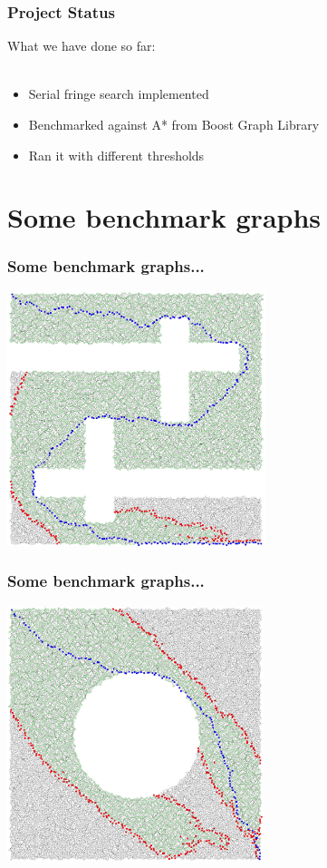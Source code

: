 \documentclass{beamer}
\begin{document}
\begin{frame}
\frametitle{Project Status}
What we have done so far:\\\quad\\
\begin{itemize}
\item Serial fringe search implemented
\item Benchmarked against A* from Boost Graph Library
\item Ran it with different thresholds
\end{itemize}
\end{frame}



\section{Some benchmark graphs}

\begin{frame}
\frametitle{Some benchmark graphs...}
\begin{center}
	\includegraphics[height=210pt]{holy.png}
\end{center}
\end{frame}

\begin{frame}
\frametitle{Some benchmark graphs...}
\begin{center}
	\includegraphics[height=210pt]{circle.png}
\end{center}
\end{frame}
\end{document}
